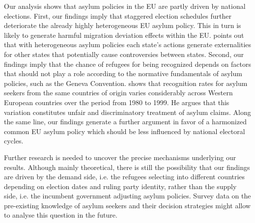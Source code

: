 \documentclass[a4paper,12pt]{article}
\begin{document}
Our analysis shows that asylum policies in the EU are partly driven by national elections. First, our findings imply that staggered election schedules further deteriorate the already highly heterogeneous EU asylum policy. This in turn is likely to generate harmful migration deviation effects within the EU. \citet{thielemann2006} points out that with heterogeneous asylum policies each state's actions generate externalities for other states that potentially cause controversies between states. Second, our findings imply that the chance of refugees for being recognized depends on factors that should not play a role according to the normative fundamentals of asylum policies, such as the Geneva Convention. \citet{neumayer2005} shows that recognition rates for asylum seekers from the same countries of origin varies considerably across Western European countries over the period from 1980 to 1999. He argues that this variation constitutes unfair and discriminatory treatment of asylum claims. Along the same line, our findings generate a further argument in favor of a harmonized common EU asylum policy which should be less influenced by national electoral cycles. 

Further research is needed to uncover the precise mechanisms underlying our results. Although mainly theoretical, there is still the possibility that our findings are driven by the demand side, i.e. the refugees selecting into different countries depending on election dates and ruling party identity, rather than the supply side, i.e. the incumbent government adjusting asylum policies. Survey data on the pre-existing knowledge of asylum seekers and their decision strategies might allow to analyse this question in the future. 
 


\pagebreak



\end{document}
